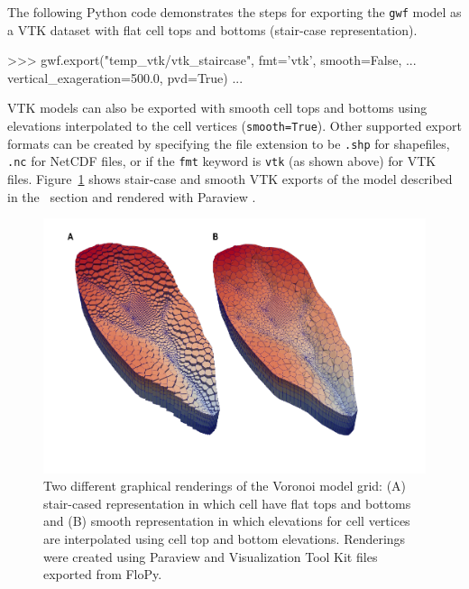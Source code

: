 \documentclass[12pt, oneside]{article}  	%
\begin{document}
The following Python code demonstrates the steps for exporting the \texttt{gwf} model as a VTK dataset with flat cell tops and bottoms (stair-case representation).

\begin{python}
>>> gwf.export("temp_vtk/vtk_staircase", fmt='vtk', smooth=False,
... vertical_exageration=500.0, pvd=True)
...
\end{python}

\noindent VTK models can also be exported with smooth cell tops and bottoms using elevations interpolated to the cell vertices (\texttt{smooth=True}). Other supported export formats can be created by specifying the file extension to be \texttt{.shp} for shapefiles, \texttt{.nc} for NetCDF files, or if the \texttt{fmt} keyword is \texttt{vtk} (as shown above) for VTK files. Figure~\ref{fig:flopyvtk} shows stair-case and smooth VTK exports of the model described in the~ section and rendered with Paraview \citep{ahrens2005paraview}.

\begin{figure}[ht!]
	\begin{center}
		\includegraphics{figures/mf6vtk.pdf}
	\end{center}
	\caption{Two different graphical renderings of the Voronoi model grid: (A) stair-cased representation in which cell have flat tops and bottoms and (B) smooth representation in which elevations for cell vertices are interpolated using cell top and bottom elevations. Renderings were created using Paraview \citep{ahrens2005paraview} and Visualization Tool Kit \citep{schroeder:2006:VTK} files exported from FloPy.}
	\label{fig:flopyvtk}
\end{figure}
\end{document}
